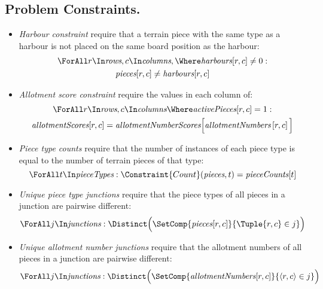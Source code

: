 \documentclass[a4paper,11pt]{article}
\begin{document}
\subsection{Problem Constraints.}
\begin{itemize}

\item \emph{Harbour constraint} require that a terrain piece with the same type as a harbour is not placed on the same board position as the harbour:
\begin{equation}
  \label{cons:harbour}
    \begin{gathered}
      \ForAll r \In \Rows, c \In \Cols, \Where \Harbours[r,c] \neq 0: \\
    \Pieces[r,c] \neq \Harbours[r,c]
  \end{gathered}
\end{equation}

\item \emph{Allotment score constraint} require the values in each column of:
  \begin{equation} \label{cons:col}
    \begin{gathered}
      \ForAll r \In \Rows, c \In \Cols \Where \ActivePieces[r,c] = 1: \\
      \AllotmentScores[r,c]=\AllotmentNumberScores \Big[ \AllotmentNumbers \left[r,c\right]\Big]
    \end{gathered}
  \end{equation}

\item \emph{Piece type counts} require that the number of instances of each piece type is equal to the number of terrain pieces of that type:
  \begin{equation} \label{cons:block}
    \ForAll t \In \PieceTypes :
    \Constraint{Count}(\Pieces, t) = \PieceTypesCounts[t]
  \end{equation}

\item \emph{Unique piece type junctions} require that the piece types of all pieces in a junction are pairwise different:
  \begin{equation} \label{cons:block}
    \ForAll j \In \Junctions :
    \Distinct \Big( \SetComp{\Pieces[r,c]}{\Tuple{r, c} \in j} \Big)
  \end{equation}

\item \emph{Unique allotment number junctions} require that the allotment numbers of all pieces in a junction are pairwise different:  
  \begin{equation} \label{cons:block}
    \ForAll j \In \Junctions :
    \Distinct \Big( \SetComp{\AllotmentNumbers[r,c]}{\langle r, c \rangle \in j} \Big)
  \end{equation}


\end{itemize}
\end{document}
